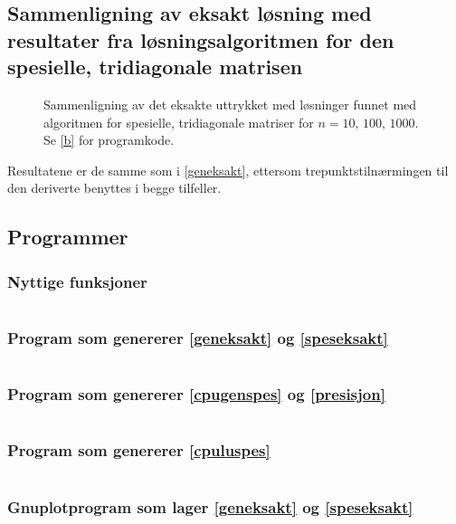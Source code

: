 \documentclass[12pt,norsk,a4paper]{report}
\begin{document}
\subsection{Sammenligning av eksakt løsning med resultater fra løsningsalgoritmen for den spesielle, tridiagonale matrisen}

\begin{figure}[H]
\centering

\caption{Sammenligning av det eksakte uttrykket med løsninger funnet med algoritmen for spesielle, tridiagonale matriser for \(n=10,\,100,\,1000\). Se \vref{b} for programkode.}
\label{speseksakt}
\end{figure}

Resultatene er de samme som i \vref{geneksakt}, ettersom trepunktstilnærmingen til den deriverte benyttes i begge tilfeller.

\clearpage
\subsection{Programmer}
\subsubsection{Nyttige funksjoner}\label{felles}
\inputminted[fontsize=\footnotesize]{cpp}{felles.cpp}\clearpage

\subsubsection{Program som genererer \vref{geneksakt} og \vref{speseksakt}}\label{b}
\inputminted[fontsize=\footnotesize]{cpp}{b.cpp}\clearpage

\subsubsection{Program som genererer \vref{cpugenspes} og \vref{presisjon}}\label{c}
\inputminted[fontsize=\footnotesize,breaklines=true]{cpp}{c.cpp}

\subsubsection{Program som genererer \vref{cpuluspes}}\label{e}
\inputminted[fontsize=\footnotesize,breaklines=true]{cpp}{e.cpp}

\subsubsection{Gnuplotprogram som lager \vref{geneksakt} og \vref{speseksakt}}
\inputminted[fontsize=\footnotesize,breaklines=true]{gnuplot}{b.gpi}



\clearpage
{}
\printbibliography
\end{document}
